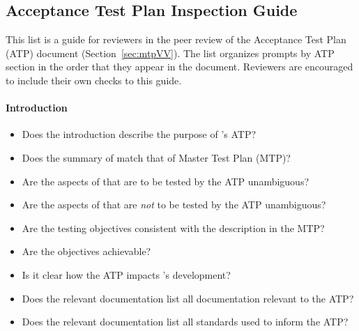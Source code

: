 \subsection{Acceptance Test Plan Inspection
Guide}\label{appendix:validationInspection}
This list is a guide for reviewers in the peer review of the Acceptance Test
Plan (ATP) document (Section~\ref{sec:mtpVV}). The list organizes prompts by
ATP section in the order that they appear in the document. Reviewers are
encouraged to include their own checks to this guide.

\paragraph{Introduction}
\begin{itemize}

    \item Does the introduction describe the purpose of \progname{}'s ATP?

    \item Does the summary of \progname{} match that of Master Test Plan (MTP)?

    \item Are the aspects of \progname{} that are to be tested by the ATP
    unambiguous?

    \item Are the aspects of \progname{} that are \textit{not} to be tested by
    the ATP unambiguous?

    \item Are the testing objectives consistent with the description in the MTP?

    \item Are the objectives achievable?

    \item Is it clear how the ATP impacts \progname{}'s development?

    \item Does the relevant documentation list all \progname{} documentation
    relevant to the ATP?

    \item Does the relevant documentation list all standards used to inform the
    ATP?

\end{itemize}


